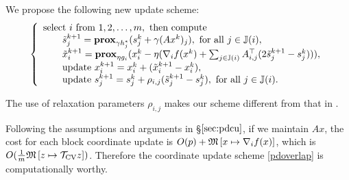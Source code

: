 {{{%
We propose the following new update scheme: 
\begin{equation}
\left\{
\begin{array}{l}
\text{select }i\text{ from } 1,2,\ldots,m, \text{ then compute}\\
\qquad\tilde{s}_j^{k+1}=\prox_{\gamma h_j^*} (s_j^k+\gamma (Ax^k)_j),~\mbox{for all}~ j\in\JJ(i),\\
\qquad\tilde{x}_i^{k+1}=\prox_{\eta g_i}(x_i^k-\eta(\nabla_i f(x^k)+\sum_{j\in\JJ(i)}A_{i,j}^\top(2\tilde{s}_j^{k+1}-s_j^k))),\\
\qquad\text{update }x_i^{k+1}=x_i^k+(\tilde{x}_i^{k+1}-x_i^k), \\
\qquad\text{update }s_j^{k+1}=s_j^k+\rho_{i,j}(\tilde{s}_j^{k+1}-s_j^k),~\mbox{for all}~ j\in\JJ(i).
\end{array}
\right.\label{pdoverlap}
\end{equation}
\begin{remark}
The use of relaxation parameters $\rho_{i,j}$ makes our scheme different from that in \cite{pesquet2014class}. %
\end{remark}
Following the assumptions and arguments in \S$\ref{sec:pdcu}$, if we maintain $Ax$, the cost for each block coordinate update is $O(p)+\mathfrak{M}\left[{x}\mapsto {\nabla_i f(x)}\right]$, which is $O(\frac{1}{m}\mathfrak{M}\left[{z}\mapsto {{{\mathcal{T}}_{\textnormal{CV}}}z}\right])$. Therefore the coordinate update scheme \eqref{pdoverlap} is computationally worthy.

}}}
